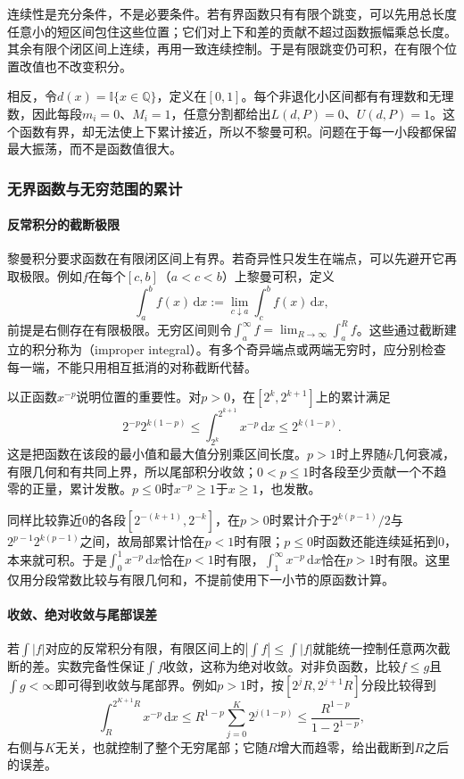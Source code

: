 连续性是充分条件，不是必要条件。若有界函数只有有限个跳变，可以先用总长度任意小的短区间包住这些位置；它们对上下和差的贡献不超过函数振幅乘总长度。其余有限个闭区间上连续，再用一致连续控制。于是有限跳变仍可积，在有限个位置改值也不改变积分。

相反，令$d(x)=\mathbb I\{x\in\mathbb Q\}$，定义在$[0,1]$。每个非退化小区间都有有理数和无理数，因此每段$m_i=0$、$M_i=1$，任意分割都给出$L(d,P)=0$、$U(d,P)=1$。这个函数有界，却无法使上下累计接近，所以不黎曼可积。问题在于每一小段都保留最大振荡，而不是函数值很大。

\subsubsection{无界函数与无穷范围的累计}
\label{sec:analysis-improper-integrals}

\paragraph{反常积分的截断极限}

黎曼积分要求函数在有限闭区间上有界。若奇异性只发生在端点，可以先避开它再取极限。例如$f$在每个$[c,b]$（$a<c<b$）上黎曼可积，定义
\[
 \int_a^b f(x)\,\mathrm dx:=\lim_{c\downarrow a}\int_c^b f(x)\,\mathrm dx,
\]
前提是右侧存在有限极限。无穷区间则令$\int_a^\infty f=\lim_{R\to\infty}\int_a^R f$。这些通过截断建立的积分称为（improper integral）。有多个奇异端点或两端无穷时，应分别检查每一端，不能只用相互抵消的对称截断代替。

以正函数$x^{-p}$说明位置的重要性。对$p>0$，在$[2^k,2^{k+1}]$上的累计满足
\[
 2^{-p}2^{k(1-p)}\leq\int_{2^k}^{2^{k+1}}x^{-p}\,\mathrm dx\leq2^{k(1-p)}.
\]
这是把函数在该段的最小值和最大值分别乘区间长度。$p>1$时上界随$k$几何衰减，有限几何和有共同上界，所以尾部积分收敛；$0<p\leq1$时各段至少贡献一个不趋零的正量，累计发散。$p\leq0$时$x^{-p}\geq1$于$x\geq1$，也发散。

同样比较靠近$0$的各段$[2^{-(k+1)},2^{-k}]$，在$p>0$时累计介于$2^{k(p-1)}/2$与$2^{p-1}2^{k(p-1)}$之间，故局部累计恰在$p<1$时有限；$p\leq0$时函数还能连续延拓到$0$，本来就可积。于是$\int_0^1x^{-p}\,\mathrm dx$恰在$p<1$时有限，$\int_1^\infty x^{-p}\,\mathrm dx$恰在$p>1$时有限。这里仅用分段常数比较与有限几何和，不提前使用下一小节的原函数计算。

\paragraph{收敛、绝对收敛与尾部误差}

若$\int |f|$对应的反常积分有限，有限区间上的$|\int f|\leq\int|f|$就能统一控制任意两次截断的差。实数完备性保证$\int f$收敛，这称为绝对收敛。对非负函数，比较$f\leq g$且$\int g<\infty$即可得到收敛与尾部界。例如$p>1$时，按$[2^jR,2^{j+1}R]$分段比较得到
\[
 \int_R^{2^{K+1}R} x^{-p}\,\mathrm dx
 \leq R^{1-p}\sum_{j=0}^K 2^{j(1-p)}
 \leq\frac{R^{1-p}}{1-2^{1-p}},
\]
右侧与$K$无关，也就控制了整个无穷尾部；它随$R$增大而趋零，给出截断到$R$之后的误差。

